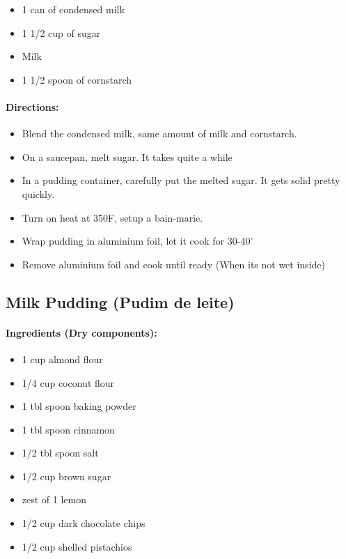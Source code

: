 \documentclass{article}
\begin{document}
\begin{itemize}
	\item 1 can of condensed milk
	\item 1 1/2 cup of sugar
	\item Milk
	\item 1 1/2 spoon of cornstarch
\end{itemize}

\paragraph{Directions:}
\begin{itemize}
	\item Blend the condensed milk, same amount of milk and cornstarch.
	\item On a saucepan, melt sugar. It takes quite a while
	\item In a pudding container, carefully put the melted sugar. It gets solid pretty quickly.
	\item Turn on heat at 350F, setup a bain-marie.
	\item Wrap pudding in aluminium foil, let it cook for 30-40'
	\item Remove aluminium foil and cook until ready (When its not wet inside)
\end{itemize}

\subsection{Milk Pudding (Pudim de leite)}

\paragraph{Ingredients (Dry components):}
\begin{itemize}
	\item 1 cup almond flour
	\item 1/4 cup coconut flour
	\item 1 tbl spoon baking powder
	\item 1 tbl spoon cinnamon
	\item 1/2 tbl spoon salt
	\item 1/2 cup brown sugar
	\item zest of 1 lemon
	\item 1/2 cup dark chocolate chips
	\item 1/2 cup shelled pistachios
\end{itemize}
\end{document}
